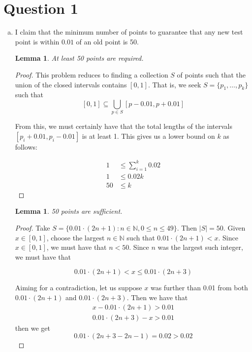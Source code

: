 \documentclass{article}
\newcommand{\N}{\mathbb{N}}
\newtheorem{lemma}[theorem]{Lemma}
\begin{document}
\section*{Question 1}

\begin{enumerate}[(a)]
    \item I claim that the minimum number of points to guarantee that any new test point is within $0.01$ of an old point is 50.  
    
    \begin{lemma}
        At least 50 points are required.
    \end{lemma}

    \begin{proof}
        This problem reduces to finding a collection $S$ of points such that the union of the closed intervals contains $[0, 1]$. That is, we seek $S = \{p_1, \dots, p_k\}$ such that \[[0, 1] \subseteq \bigcup_{p \in S} [p - 0.01, p + 0.01]\] 

        From this, we must certainly have that the total lengths of the intervals $[p_i + 0.01, p_i - 0.01]$ is at least 1. This gives us a lower bound on $k$ as follows:

        \begin{align*}
            1 &\leq \sum_{i = 1}^k 0.02 \\
            1 &\leq 0.02k \\
            50 &\leq k
        \end{align*}
    \end{proof}

    \begin{lemma}
        50 points are sufficient.
    \end{lemma}

    \begin{proof}
        Take $S = \{0.01 \cdot (2n + 1) : n \in \N, 0 \leq n \leq 49\}$. Then $|S| = 50$. Given $x \in [0, 1]$, choose the largest $n \in \N$ such that $0.01 \cdot (2n + 1) < x$. Since $x \in [0, 1]$, we must have that $n < 50$. Since $n$ was the largest such integer, we must have that

        \[0.01 \cdot (2n + 1) < x \leq 0.01 \cdot (2n + 3)\]

        Aiming for a contradiction, let us suppose $x$ was further than 0.01 from both $0.01 \cdot (2n + 1)$ and $0.01 \cdot (2n + 3)$. Then we have that \begin{align*}
            x - 0.01 \cdot (2n + 1) > 0.01\\
            0.01 \cdot (2n + 3) - x > 0.01
        \end{align*}
        then we get \[0.01 \cdot (2n + 3 - 2n - 1) = 0.02 > 0.02\]


\end{proof}
\end{enumerate}
\end{document}
